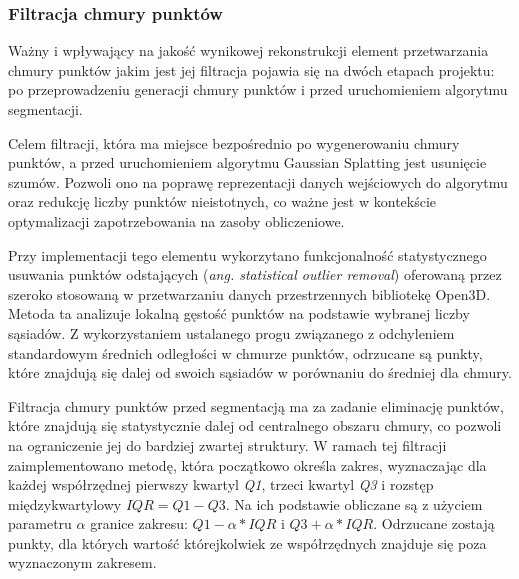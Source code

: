 \subsubsection{Filtracja chmury punktów}
Ważny i wpływający na jakość wynikowej rekonstrukcji element przetwarzania chmury punktów jakim jest jej filtracja pojawia się na dwóch etapach projektu: po przeprowadzeniu generacji chmury punktów i przed uruchomieniem algorytmu segmentacji. 

Celem filtracji, która ma miejsce bezpośrednio po wygenerowaniu chmury punktów, a przed uruchomieniem algorytmu Gaussian Splatting jest usunięcie szumów. Pozwoli ono na poprawę reprezentacji danych wejściowych do algorytmu oraz redukcję liczby punktów nieistotnych, co ważne jest w kontekście optymalizacji zapotrzebowania na zasoby obliczeniowe.

Przy implementacji tego elementu wykorzytano funkcjonalność statystycznego usuwania punktów odstających (\textit{ang. statistical outlier removal}) oferowaną przez szeroko stosowaną w przetwarzaniu danych przestrzennych bibliotekę Open3D\cite{Zhou2018}. Metoda ta analizuje lokalną gęstość punktów na podstawie wybranej liczby sąsiadów. Z wykorzystaniem ustalanego progu związanego z odchyleniem standardowym średnich odległości w chmurze punktów, odrzucane są punkty, które znajdują się dalej od swoich sąsiadów w porównaniu do średniej dla chmury. 

Filtracja chmury punktów przed segmentacją ma za zadanie eliminację punktów, które znajdują się 
statystycznie dalej od centralnego obszaru chmury, co pozwoli na ograniczenie jej do bardziej zwartej struktury. W ramach tej filtracji zaimplementowano metodę\cite{raviteja2023outliers}, która początkowo określa zakres, wyznaczając dla każdej współrzędnej pierwszy kwartyl \textit{Q1}, trzeci kwartyl \textit{Q3} i rozstęp międzykwartylowy $IQR = Q1 - Q3$. Na ich podstawie obliczane są z użyciem parametru $\alpha$ granice zakresu: $Q1 - \alpha * IQR$ i $Q3 + \alpha * IQR$. Odrzucane zostają punkty, dla których wartość którejkolwiek ze współrzędnych znajduje się poza wyznaczonym zakresem.
